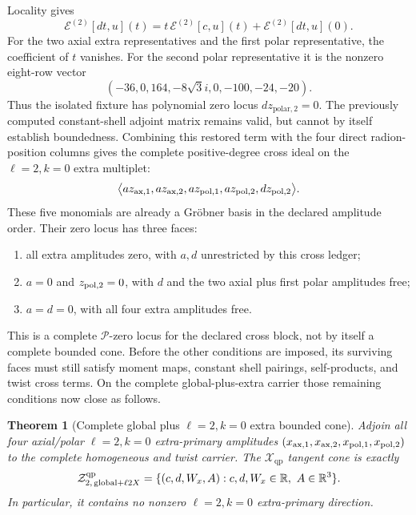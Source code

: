 \documentclass[11pt]{article}
\newtheorem{theorem}{Theorem}[section]
\theoremstyle{definition}
\theoremstyle{remark}
\newcommand{\R}{\mathbb R}
\newcommand{\cE}{\mathcal E}
\newcommand{\cZ}{\mathcal Z}
\newcommand{\cP}{\mathcal P}
\newcommand{\Xqp}{\mathscr X_{\mathrm{qp}}}
\begin{document}
Locality gives
\[
 \cE^{(2)}[dt,u](t)=t\,\cE^{(2)}[c,u](t)
                    +\cE^{(2)}[dt,u](0).
\]
For the two axial extra representatives and the first polar representative,
the coefficient of \(t\) vanishes.  For the second polar representative it
is the nonzero eight-row vector
\[
 (-36,0,164,-8\sqrt3 i,0,-100,-24,-20).
\]
Thus the isolated fixture has polynomial zero locus
\(d z_{\mathrm{polar},2}=0\).  The previously computed constant-shell
adjoint matrix remains valid, but cannot by itself establish boundedness.
Combining this restored term with the four direct radion-position columns
gives the complete positive-degree cross ideal on the
\(\ell=2,k=0\) extra multiplet:
\begin{equation}\label{eq:ad-polynomial-ideal}
 \bigl\langle
 a z_{\rm ax,1},a z_{\rm ax,2},a z_{\rm pol,1},a z_{\rm pol,2},
 d z_{\rm pol,2}\bigr\rangle .
\end{equation}
These five monomials are already a Gr\"obner basis in the declared amplitude
order.  Their zero locus has three faces:
\begin{enumerate}
\item all extra amplitudes zero, with \(a,d\) unrestricted by this cross
      ledger;
\item \(a=0\) and \(z_{\rm pol,2}=0\), with \(d\) and the two axial plus
      first polar amplitudes free;
\item \(a=d=0\), with all four extra amplitudes free.
\end{enumerate}
This is a complete \(\cP\)-zero locus for the declared cross block, not by
itself a complete bounded cone.  Before the other conditions are imposed,
its surviving faces must still satisfy moment maps, constant shell pairings,
self-products, and twist cross terms.  On the complete global-plus-extra
carrier those remaining conditions now close as follows.

\begin{theorem}[Complete global plus \(\ell=2,k=0\) extra bounded cone]
\label{thm:global-ell2-bounded}
Adjoin all four axial/polar \(\ell=2,k=0\) extra-primary amplitudes
\((x_{\rm ax,1},x_{\rm ax,2},x_{\rm pol,1},x_{\rm pol,2})\) to the complete
homogeneous and twist carrier.  The \(\Xqp\) tangent cone is exactly
\begin{equation}
 \cZ^{\rm qp}_{2,\,\mathrm{global}+\ell2X}
 =\{(c,d,W_x,A):c,d,W_x\in\R,\ A\in\R^3\}.
\end{equation}
In particular, it contains no nonzero \(\ell=2,k=0\) extra-primary
direction.
\end{theorem}
\end{document}
